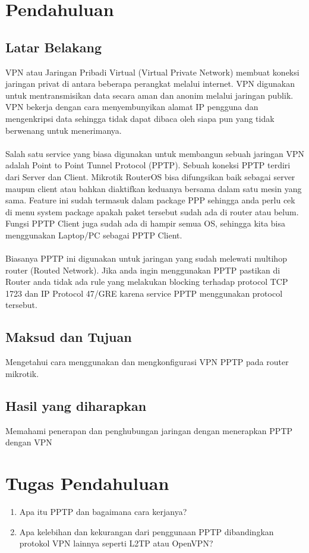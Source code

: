 \section{Pendahuluan}
\subsection{Latar Belakang}
VPN atau Jaringan Pribadi Virtual (Virtual Private Network) membuat koneksi jaringan privat di
antara beberapa perangkat melalui internet. VPN digunakan untuk mentransmisikan data secara aman
dan anonim melalui jaringan publik. VPN bekerja dengan cara menyembunyikan alamat IP pengguna
dan mengenkripsi data sehingga tidak dapat dibaca oleh siapa pun yang tidak berwenang untuk
menerimanya.\\\\
Salah satu service yang biasa digunakan untuk membangun sebuah jaringan VPN adalah Point to
Point Tunnel Protocol (PPTP). Sebuah koneksi PPTP terdiri dari Server dan Client.
Mikrotik RouterOS bisa difungsikan baik sebagai server maupun client atau bahkan diaktifkan
keduanya bersama dalam satu mesin yang sama. Feature ini sudah termasuk dalam package PPP
sehingga anda perlu cek di menu system package apakah paket tersebut sudah ada di router atau
belum. Fungsi PPTP Client juga sudah ada di hampir semua OS, sehingga kita bisa menggunakan
Laptop/PC sebagai PPTP Client.\\\\
Biasanya PPTP ini digunakan untuk jaringan yang sudah melewati multihop router (Routed Network).
Jika anda ingin menggunakan PPTP pastikan di Router anda tidak ada rule yang melakukan blocking
terhadap protocol TCP 1723 dan IP Protocol 47/GRE karena service PPTP menggunakan protocol
tersebut.

\subsection{Maksud dan Tujuan}
Mengetahui cara menggunakan dan mengkonfigurasi VPN PPTP pada router mikrotik.

\subsection{Hasil yang diharapkan}
Memahami penerapan dan penghubungan jaringan dengan menerapkan PPTP dengan VPN

\section{Tugas Pendahuluan}
\begin{center}
	\colorbox{cyan!30}{\parbox{0.8\linewidth}{
    \begin{enumerate}
        \item Apa itu PPTP dan bagaimana cara kerjanya?
        \item Apa kelebihan dan kekurangan dari penggunaan PPTP dibandingkan protokol VPN lainnya seperti L2TP atau OpenVPN?
    \end{enumerate}}}
\end{center}

